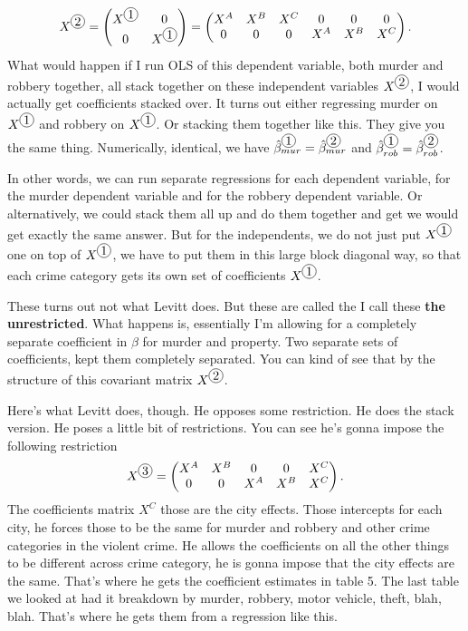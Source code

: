 \documentclass[11pt,a4paper]{amsart}
\theoremstyle{plain}
\theoremstyle{definition}
\newcommand*\circled[1]{\tikz[baseline=(char.base)]{
		\node[shape=circle,draw,inner sep=1pt] (char) {#1};}} %
\begin{document}
			 \[	X^{\circled{2}} =  \begin{pmatrix}
				 X^{\circled{1}} & 0 \\
				 0 & X^{\circled{1}}
			 \end{pmatrix} = \begin{pmatrix}
			 X^{A} & X^{B} & X^{C} & 0 & 0 & 0 \\
			 0 & 0 & 0 & X^{A} & X^{B} & X^{C} 
			 \end{pmatrix}.	\]
			 What would happen if I run OLS of this dependent variable, both murder and robbery together, all stack together on these independent variables $X^{\circled{2}}$,  I would actually get coefficients stacked over. It turns out either regressing murder on $X^{\circled{1}}$ and robbery on $X^{\circled{1}}$. Or stacking them together like this. They give you the same thing. Numerically, identical, we have $\hat{\beta}^{\circled{1}}_{mur} = \hat{\beta}^{\circled{2}}_{mur}$ and $\hat{\beta}^{\circled{1}}_{rob} = \hat{\beta}^{\circled{2}}_{rob}$.\par 
			  In other words, we can run separate regressions for each dependent variable, for the murder dependent variable and for the robbery dependent variable. Or alternatively, we could stack them all up and do them together and get we would get exactly the same answer. But for the independents, we do not just put $X^{\circled{1}}$ one on top of $X^{\circled{1}}$, we have to put them in this large block diagonal way, so that each crime category gets its own set of coefficients $X^{\circled{1}}$. \par 
			  These turns out not what Levitt does. But these are called the I call these \textbf{the unrestricted}. What happens is, essentially I'm allowing for a completely separate coefficient in $\beta$ for murder and property. Two separate sets of coefficients, kept them completely separated. You can kind of see that by the structure of this covariant matrix $X^{\circled{2}}$. \par 
			  Here's what Levitt does, though. He opposes some restriction. He does the stack version. He poses a little bit of restrictions. You can see he's gonna impose the following restriction
			  \[	X^{\circled{3}}  = \begin{pmatrix}
			  X^{A} & X^{B} & 0 & 0 & X^{C} \\
			  0 & 0  & X^{A} & X^{B} & X^{C} 
			  \end{pmatrix}.		\]
			   The coefficients matrix $X^{C} $ those are the city effects. Those intercepts for each city, he forces those to be the same for murder and robbery and other crime categories in the violent crime. He allows the coefficients on all the other things to be different across crime category, he is gonna impose that the city effects are the same. That's where he gets the coefficient estimates in table 5. The last table we looked at had it breakdown by murder, robbery, motor vehicle, theft, blah, blah. That's where he gets them from a regression like this. \par 
\end{document}
